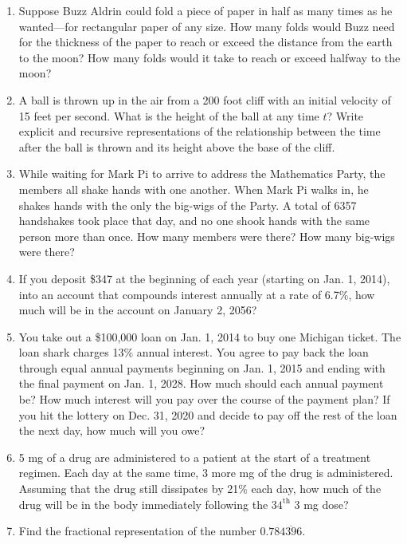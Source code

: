 \begin{problems}
\begin{enumerate}
\item Suppose Buzz Aldrin could fold a piece of paper in half as many times as he wanted---for rectangular paper of any size.  How many folds would Buzz need for the thickness of the paper to reach or exceed the distance from the earth to the moon?  How many folds would it take to reach or exceed halfway to the moon?

\item A ball is thrown up in the air from a 200 foot cliff with an initial velocity of 15 feet per second.  What is the height of the ball at any time $t$?  Write explicit and recursive representations of the relationship between the time after the ball is thrown and its height above the base of the cliff.

\item While waiting for Mark Pi to arrive to address the Mathematics Party, the members all shake hands with one another.  When Mark Pi walks in, he shakes hands with the only the big-wigs of the Party.  A total of 6357 handshakes took place that day, and no one shook hands with the same person more than once.  How many members were there?  How many big-wigs were there?

\item If you deposit \$347 at the beginning of each year (starting on Jan. 1, 2014), into an account that compounds interest annually at a rate of 6.7\%, how much will be in the account on January 2, 2056?

\item You take out a \$100,000 loan on Jan. 1, 2014 to buy one Michigan ticket.  The loan shark charges 13\% annual interest.  You agree to pay back the loan through equal annual payments beginning on Jan. 1, 2015 and ending with the final payment on Jan. 1, 2028.  How much should each annual payment be? How much interest will you pay over the course of the payment plan?  If you hit the lottery on Dec. 31, 2020 and decide to pay off the rest of the loan the next day, how much will you owe?

\item 5 mg of a drug are administered to a patient at the start of a treatment regimen.  Each day at the same time, 3 more mg of the drug is administered.  Assuming that the drug still dissipates by 21\% each day, how much of the drug will be in the body immediately following the 3$4^\mathrm{th}$ 3 mg dose?

\item Find the fractional representation of the number $0.78\overline{4396}$.


\end{enumerate}
\end{problems}
